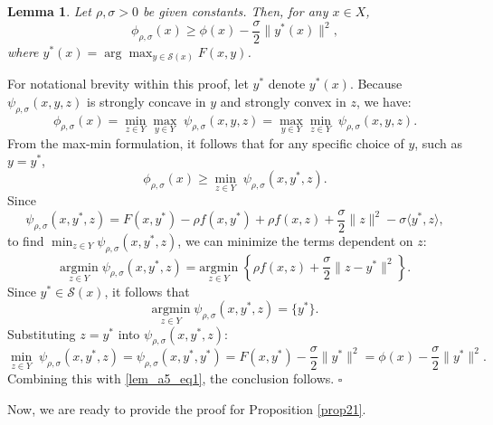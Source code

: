 \documentclass{article}
\newtheorem{lemma}[theorem]{Lemma}
\newenvironment{proof}[1][Proof]{\par
	\normalfont\topsep6pt\relax
	\trivlist\item[\hskip\labelsep\itshape #1.]\ignorespaces
}{%
	\hfill\ensuremath{\square}\endtrivlist
}
\begin{document}
\begin{lemma}\label{lem_a5}
 Let $\rho, \sigma >0$ be given constants. Then, for any $x \in X$, 
\[
 \phi_{\rho,\sigma}(x) \ge \phi(x)- \frac{\sigma}{2}\|y^*(x)\|^2,
\]
where $y^*(x) = \arg\max_{y \in \mathcal{S}(x)}F(x,y)$.
\end{lemma}
\begin{proof}
% 

For notational brevity within this proof, let $y^*$ denote $y^*(x)$.
Because $\psi_{\rho,\sigma}(x, y, z)$ is strongly concave in $y$ and strongly convex in $z$, we have:
\[ 
\phi_{\rho,\sigma}(x) =\min_{z\in {Y}} \max_{ y \in {Y}}\; \psi_{\rho,\sigma}(x, y, z) =  \max_{ y \in {Y}} \min_{z\in {Y}}\; \psi_{\rho,\sigma}(x, y, z). 
\]
From the max-min formulation, it follows that for any specific choice of $y$, such as $y = y^*$,
\begin{equation}\label{lem_a5_eq1}
    \phi_{\rho,\sigma}(x) \ge \min_{z\in {Y}}\; \psi_{\rho,\sigma}(x, y^*, z).
\end{equation}
Since
\[
\psi_{\rho,\sigma}(x, y^*, z) = F(x,y^*)-\rho f(x,y^*) + \rho f(x,z)+\frac{\sigma}{2}\|z\|^2-\sigma\langle y^*, z\rangle,
\]
to find $\min_{z\in {Y}} \psi_{\rho,\sigma}(x, y^*, z)$, we can minimize the terms dependent on $z$:
\[
\underset{z\in {Y}}{\mathrm{argmin}}\; \psi_{\rho,\sigma}(x, y^*, z) = \underset{z\in {Y}}{\mathrm{argmin}}\; \left\{ \rho f(x,z)+\frac{\sigma}{2}\|z - y^*\|^2 \right\}.
\]
Since $y^*\in \mathcal{S}(x)$, it follows that
\[
\underset{z\in {Y}}{\mathrm{argmin}}\; \psi_{\rho,\sigma}(x, y^*, z) = \{ y^*\}.
\]
Substituting $z = y^*$ into $\psi_{\rho,\sigma}(x, y^*, z) $:
\[
\min_{z\in {Y}}\; \psi_{\rho,\sigma}(x, y^*, z) = \psi_{\rho,\sigma}(x, y^*, y^*) = F(x,y^*) - \frac{\sigma}{2}\|y^*\|^2 = \phi(x)- \frac{\sigma}{2}\|y^*\|^2.
\]
Combining this with \eqref{lem_a5_eq1}, the conclusion follows.
\end{proof}

Now, we are ready to provide the proof for Proposition \ref{prop21}.
\end{document}
